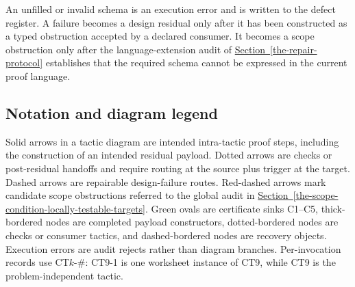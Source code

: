 \documentclass[
  11pt,
]{article}
\theoremstyle{definition}
\newcommand{\secref}[1]{\hyperref[#1]{Section~\ref*{#1}}}
\begin{document}
An unfilled or invalid schema is an execution error and is written to the
defect register. A failure becomes a design residual only after it has
been constructed as a typed obstruction accepted by a declared consumer.
It becomes a scope obstruction only after the language-extension audit of
\secref{the-repair-protocol} establishes that the required schema cannot
be expressed in the current proof language.

\subsection{Notation and diagram legend}\label{data-notation-legend}
Solid arrows in a tactic diagram are intended intra-tactic proof steps,
including the construction of an intended residual payload.  Dotted
arrows are checks or post-residual handoffs and require routing at the
source plus trigger at the target.  Dashed arrows are repairable
design-failure routes. Red-dashed arrows mark candidate scope
obstructions referred to the global audit in
\secref{the-scope-condition-locally-testable-targets}. Green
ovals are certificate sinks C1--C5, thick-bordered nodes are completed
payload constructors, dotted-bordered nodes are checks or consumer
tactics, and dashed-bordered nodes are recovery objects.  Execution
errors are audit rejects rather than diagram branches.  Per-invocation
records use CT\(k\)-\(\#\): CT9-1 is one worksheet instance of CT9,
while CT9 is the problem-independent tactic.
\end{document}
